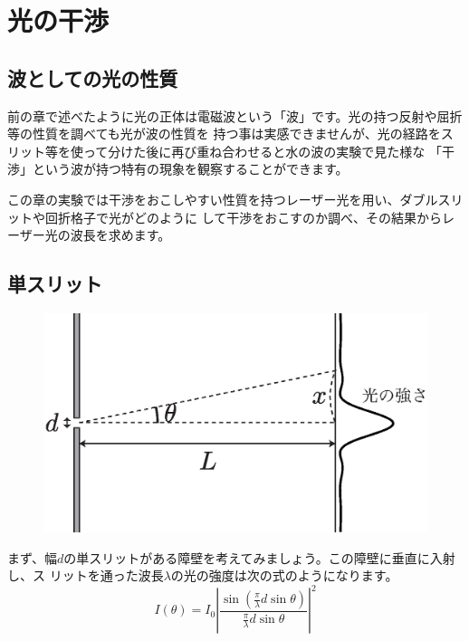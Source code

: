 %
%


\section{光の干渉}

\subsection{波としての光の性質}

前の章で述べたように光の正体は電磁波という「波」です。光の持つ反射や屈折等の性質を調べても光が波の性質を
持つ事は実感できませんが、光の経路をスリット等を使って分けた後に再び重ね合わせると水の波の実験で見た様な
「干渉」という波が持つ特有の現象を観察することができます。

この章の実験では干渉をおこしやすい性質を持つレーザー光を用い、ダブルスリットや回折格子で光がどのように
して干渉をおこすのか調べ、その結果からレーザー光の波長を求めます。

\subsection{単スリット}

\begin{figure}
\vspace*{-0.8cm}
\includegraphics[scale=0.5]{03_Interference/one-slit.eps}
\end{figure}


まず、幅$d$の単スリットがある障壁を考えてみましょう。この障壁に垂直に入射し、ス
リットを通った波長$\lambda$の光の強度は次の式のようになります。
\[
I(\theta)=I_0
\left|
\frac{\sin\left(\frac{\pi}{\lambda}d\sin\theta\right)}{\frac{\pi}{\lambda}d\sin\theta}
\right|^2
\]

